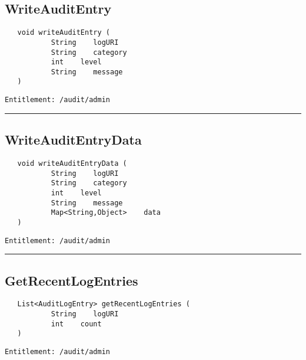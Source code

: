 \subsection{WriteAuditEntry}
\label{Api:WriteAuditEntry}
\begin{Verbatim}
   void writeAuditEntry (
           String    logURI
           String    category
           int    level
           String    message
   )
\end{Verbatim}
\begin{Verbatim}[formatcom=\color{Maroon}]
  Entitlement: /audit/admin
\end{Verbatim}



\rule{12cm}{2pt}
\subsection{WriteAuditEntryData}
\label{Api:WriteAuditEntryData}
\begin{Verbatim}
   void writeAuditEntryData (
           String    logURI
           String    category
           int    level
           String    message
           Map<String,Object>    data
   )
\end{Verbatim}
\begin{Verbatim}[formatcom=\color{Maroon}]
  Entitlement: /audit/admin
\end{Verbatim}



\rule{12cm}{2pt}
\subsection{GetRecentLogEntries}
\label{Api:GetRecentLogEntries}
\begin{Verbatim}
   List<AuditLogEntry> getRecentLogEntries (
           String    logURI
           int    count
   )
\end{Verbatim}
\begin{Verbatim}[formatcom=\color{Maroon}]
  Entitlement: /audit/admin
\end{Verbatim}



